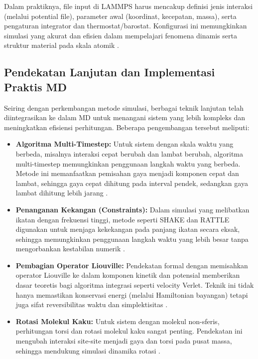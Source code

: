 Dalam praktiknya, file input di LAMMPS harus mencakup definisi jenis interaksi (melalui potential file), parameter awal (koordinat, kecepatan, massa), serta pengaturan integrator dan thermostat/barostat. Konfigurasi ini memungkinkan simulasi yang akurat dan efisien dalam mempelajari fenomena dinamis serta struktur material pada skala atomik \citep{Plimpton1995}. \subsection{Pendekatan Lanjutan dan Implementasi Praktis MD}
Seiring dengan perkembangan metode simulasi, berbagai teknik lanjutan telah diintegrasikan ke dalam MD untuk menangani sistem yang lebih kompleks dan meningkatkan efisiensi perhitungan. Beberapa pengembangan tersebut meliputi:
\begin{itemize}
    \item \textbf{Algoritma Multi-Timestep:} Untuk sistem dengan skala waktu yang berbeda, misalnya interaksi cepat berubah dan lambat berubah, algoritma multi-timestep memungkinkan penggunaan langkah waktu yang berbeda. Metode ini memanfaatkan pemisahan gaya menjadi komponen cepat dan lambat, sehingga gaya cepat dihitung pada interval pendek, sedangkan gaya lambat dihitung lebih jarang \citep{Frenkel2002}. \item \textbf{Penanganan Kekangan (Constraints):} Dalam simulasi yang melibatkan ikatan dengan frekuensi tinggi, metode seperti SHAKE dan RATTLE digunakan untuk menjaga kekekangan pada panjang ikatan secara eksak, sehingga memungkinkan penggunaan langkah waktu yang lebih besar tanpa mengorbankan kestabilan numerik \citep{Frenkel2002}. \item \textbf{Pembagian Operator Liouville:} Pendekatan formal dengan memisahkan operator Liouville ke dalam komponen kinetik dan potensial memberikan dasar teoretis bagi algoritma integrasi seperti velocity Verlet. Teknik ini tidak hanya memastikan konservasi energi (melalui Hamiltonian bayangan) tetapi juga sifat reversibilitas waktu dan simplektisitas \citep{Frenkel2002}. \item \textbf{Rotasi Molekul Kaku:} Untuk sistem dengan molekul non-sferis, perhitungan torsi dan rotasi molekul kaku sangat penting. Pendekatan ini mengubah interaksi site-site menjadi gaya dan torsi pada pusat massa, sehingga mendukung simulasi dinamika rotasi \citep{Frenkel2002}. \end{itemize}


